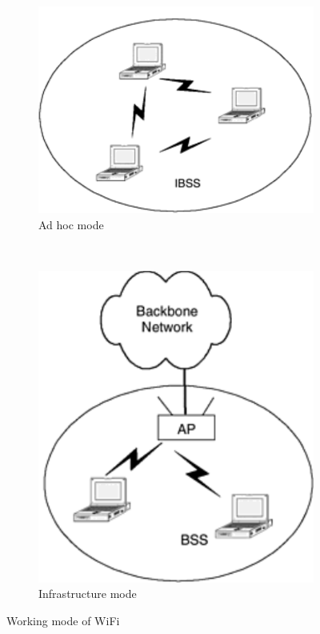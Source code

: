 \begin{figure}[!h]
\begin{subfigure}[t]{.5\textwidth}  
\centering
\includegraphics[scale=.3]{./figure/chp1/ibss.png}
\caption{Ad hoc mode}
\label{fig_adhoc}
\end{subfigure}
~
\begin{subfigure}[t]{.5\textwidth}  
\centering
\includegraphics[scale=.3]{./figure/chp1/bss.png}
\caption{Infrastructure mode}
\end{subfigure}
\caption{Working mode of WiFi}
\label{fig_infras}
\end{figure}

